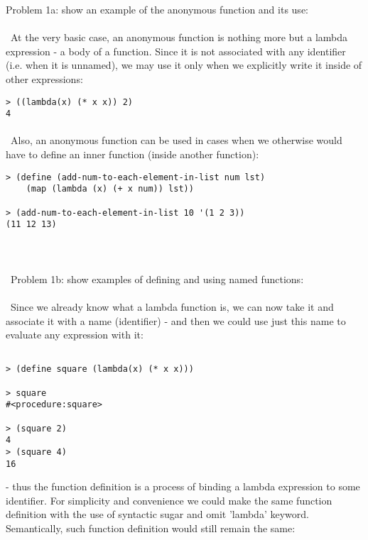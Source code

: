 \documentclass{article}
\begin{document}
Problem 1a: show an example of the anonymous function and its use:
\paragraph{}\
At the very basic case, an anonymous function is nothing more but a lambda expression - a body of a function. Since it is not associated with any identifier (i.e. when it is unnamed), we may use it only when we explicitly write it inside of other expressions:
\ttfamily
	
\begin{verbatim} 
> ((lambda(x) (* x x)) 2) 
4
\end{verbatim}

\rmfamily
\paragraph{}\
Also, an anonymous function can be used in cases when we otherwise would have to define an inner function (inside another function):

\begin{verbatim} 
> (define (add-num-to-each-element-in-list num lst)
    (map (lambda (x) (+ x num)) lst))
  
> (add-num-to-each-element-in-list 10 '(1 2 3))
(11 12 13)
\end{verbatim}

\paragraph{}\
\paragraph{}\
Problem 1b: show examples of defining and using named functions:
\paragraph{}\
Since we already know what a lambda function is, we can now take it and associate it with a name (identifier) - and then we could use just this name to evaluate any expression with it:

\begin{verbatim} 
 
> (define square (lambda(x) (* x x)))

> square
#<procedure:square>

> (square 2)
4
> (square 4)
16
\end{verbatim}
- thus the function definition is a process of binding a lambda expression to some identifier. For simplicity and convenience we could make the same function definition with the use of syntactic sugar and omit 'lambda' keyword. Semantically, such function definition would still remain the same:
\end{document}
